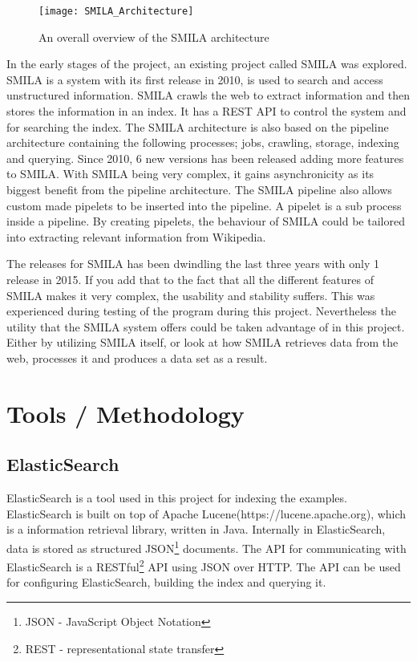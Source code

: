 \begin{figure}[h]
\caption{An overall overview of the SMILA architecture}
\texttt{[image: SMILA\_Architecture]}
\end{figure}



In the early stages of the project, an existing project called SMILA\cite{smila} was explored. SMILA is a system with its first release in 2010, is used to search and access unstructured information. SMILA crawls the web to extract information and then stores the information in an index. It has a REST API to control the system and for searching the index. The SMILA architecture is also based on the pipeline architecture containing the following processes; jobs, crawling, storage, indexing and querying. Since 2010, 6 new versions has been released adding more features to SMILA. With SMILA being very complex, it gains asynchronicity as its biggest benefit from the pipeline architecture. The SMILA pipeline also allows custom made pipelets to be inserted into the pipeline. A pipelet is a sub process inside a pipeline. By creating pipelets, the behaviour of SMILA could be tailored into extracting relevant information from Wikipedia.

The releases for SMILA has been dwindling the last three years with only 1 release in 2015. If you add that to the fact that all the different features of SMILA makes it very complex, the usability and stability suffers. This was experienced during testing of the program during this project.
Nevertheless the utility that the SMILA system offers could be taken advantage of in this project. Either by utilizing SMILA itself, or look at how SMILA retrieves data from the web, processes it and produces a data set as a result.


\section{Tools / Methodology}

\subsection{ElasticSearch} \label{elasticsearch}
ElasticSearch is a tool used in this project for indexing the examples. ElasticSearch is built on top of Apache Lucene(https://lucene.apache.org), which is a information retrieval library, written in Java. Internally in ElasticSearch, data is stored as structured JSON\footnote{JSON - JavaScript Object Notation} documents. The API for communicating with ElasticSearch is a RESTful\footnote{REST - representational state transfer} API using JSON over HTTP. The API can be used for configuring ElasticSearch, building the index and querying it. 


